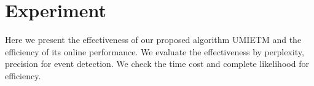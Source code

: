 \documentclass[runningheads,a4paper]{llncs}
\begin{document}
\section{Experiment}
Here we present the effectiveness of our proposed algorithm UMIETM and the efficiency of its online performance.
We evaluate the effectiveness by perplexity, precision for event detection. 
We check the time cost and complete likelihood for efficiency.
\end{document}

